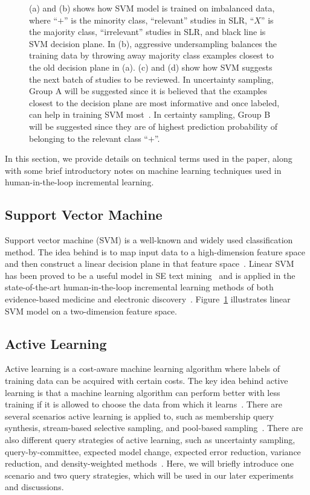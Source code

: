 \documentclass[final,twocolumn,5p]{elsarticle}
\theoremstyle{break}
\begin{document}
\begin{figure}[!t]
    \caption{(a) and (b) shows how SVM model is trained on imbalanced data, where ``$+$'' is the minority class, ``relevant'' studies in SLR, ``$X$'' is the majority class, ``irrelevant'' studies in SLR, and black line is SVM decision plane. In (b), aggressive undersampling balances the training data by throwing away majority class examples closest to the old decision plane in (a). (c) and (d) show how SVM suggests the next batch of studies to be reviewed. In uncertainty sampling, Group A will be suggested since it is believed that the examples closest to the decision plane are most informative and once labeled, can help in training SVM most~\cite{settles2012active}. In certainty sampling, Group B will be suggested since they are of highest prediction probability of belonging to the relevant class ``$+$''.}
    \label{fig:SVM}
\end{figure}

In this section, we provide details on technical terms 
used in the paper,  along with some brief introductory
notes on machine learning techniques used in human-in-the-loop incremental learning.

\subsection{Support Vector Machine}
\label{sect: Support Vector Machine}

Support vector machine (SVM) is a well-known and widely used classification method. The idea behind is to map input data to a high-dimension feature space and then construct a linear decision plane in that feature space~\cite{cortes1995support}. Linear SVM~\cite{joachims2006training} has been proved to be a useful model in SE text mining~\cite{krishna2016bigse} and is applied in the state-of-the-art human-in-the-loop incremental learning methods of both evidence-based medicine and electronic discovery~\cite{wallace2010semi,cormack2014evaluation}. Figure~\ref{fig:SVM} illustrates linear SVM model on a two-dimension feature space.

\subsection{Active Learning}
\label{sect: Active learning}

Active learning is a cost-aware machine learning algorithm where labels of training data can be acquired with certain costs. The key idea behind active learning is that a machine learning algorithm can perform better with less
training if it is allowed to choose the data from which it learns~\cite{settles2012active}. There are several scenarios active learning is applied to, such as membership query synthesis, stream-based selective sampling, and pool-based sampling~\cite{settles2010active}. There are also different query strategies of active learning, such as uncertainty sampling, query-by-committee, expected model change, expected error reduction, variance reduction, and density-weighted methods~\cite{settles2010active}. Here, we will briefly introduce one scenario and two query strategies, which will be used in our later experiments and discussions.
\end{document}
